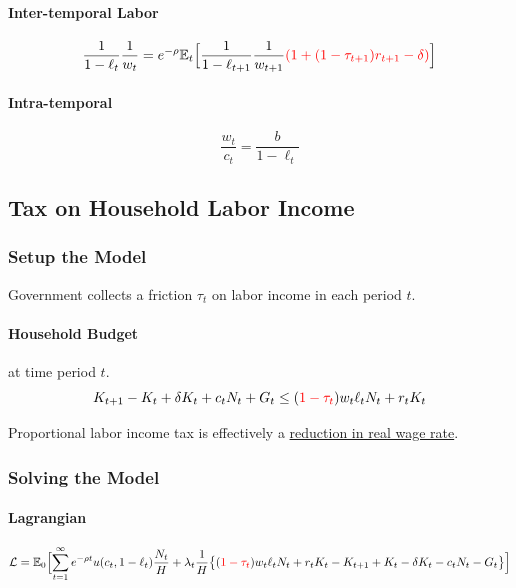 \documentclass[11pt]{article}
\newcommand{\expat}[2]{\mathbb{E}_{#1}\Big[{#2}\Big]}
\begin{document}
			\paragraph{Inter-temporal Labor}
				\begin{equation}
					\frac{1}{1-\ell_t}\frac{1}{w_t} = e^{-\rho} \expat{t}{
						\frac{1}{1-\ell_{t+1}} \frac{1}{w_{t+1}} \textcolor{red}{(1 + (1-\tau_{t+1})r_{t+1} - \delta)}
					}
				\end{equation}
				
			\paragraph{Intra-temporal}
				\begin{equation}
					\frac{w_t}{c_t} = \frac{b}{1-\ell_t}
				\end{equation}

		\subsection{Tax on Household Labor Income}
			\subsubsection{Setup the Model}
			\begin{assumption}
				Government collects a friction $\tau_t$ on labor income in each period $t$.
			\end{assumption}
			
			\paragraph{Household Budget} at time period $t$.
				\begin{equation}
					K_{t+1} - K_t + \delta K_t + c_t N_t + G_t \leq (\textcolor{red}{1-\tau_t}) w_t \ell_t N_t + r_t K_t	
				\end{equation}
			
			\begin{remark}[Interpretation]
				Proportional labor income tax is effectively a \ul{reduction in real wage rate}.
			\end{remark}
				
			\subsubsection{Solving the Model}
			\paragraph{Lagrangian}
				\begin{equation}
					\mc{L} = \expat{0}{ \sum_{t=1}^\infty e^{-\rho t} u(c_t, 1 - \ell_t) \frac{N_t}{H} + \lambda_t \frac{1}{H} 
						\big \{ (\textcolor{red}{1-\tau_t}) w_t \ell_t N_t + r_t K_t - K_{t+1} + K_t - \delta K_t - c_t N_t - G_t \big \} }
				\end{equation}
\end{document}
